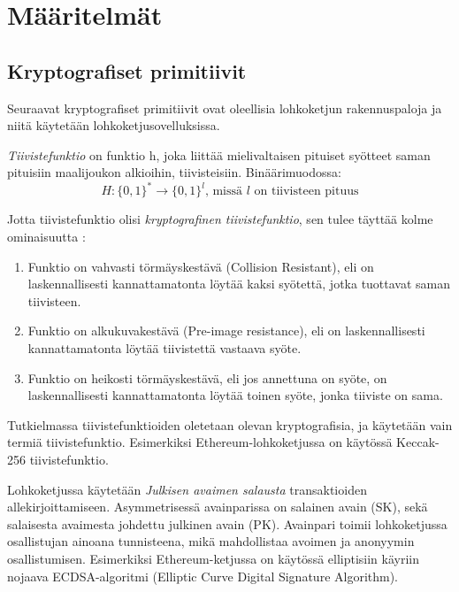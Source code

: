 \chapter{Määritelmät\label{methods}}

\section{Kryptografiset primitiivit}

Seuraavat kryptografiset primitiivit ovat oleellisia lohkoketjun rakennuspaloja ja niitä käytetään lohkoketjusovelluksissa.

\textit{Tiivistefunktio} on funktio h, joka liittää mielivaltaisen pituiset syötteet saman pituisiin maalijoukon alkioihin, tiivisteisiin. Binäärimuodossa: 
\begin{equation}
    H : \{0, 1\}^* \longrightarrow  \{0, 1\}^l \text{, missä $l$ on tiivisteen pituus}
\end{equation}

Jotta tiivistefunktio olisi \textit{kryptografinen tiivistefunktio}, sen tulee täyttää kolme ominaisuutta \cite{cryptoeprint:2011:565}: 
\begin{enumerate}
    \item Funktio on vahvasti törmäyskestävä (Collision Resistant), eli on laskennallisesti kannattamatonta löytää kaksi syötettä, jotka tuottavat saman tiivisteen.
    \item Funktio on alkukuvakestävä (Pre-image resistance), eli on laskennallisesti kannattamatonta löytää tiivistettä vastaava syöte.
    \item Funktio on heikosti törmäyskestävä, eli jos annettuna on syöte, on laskennallisesti kannattamatonta löytää toinen syöte, jonka tiiviste on sama.
\end{enumerate}

Tutkielmassa tiivistefunktioiden oletetaan olevan kryptografisia, ja käytetään vain termiä tiivistefunktio. Esimerkiksi Ethereum-lohkoketjussa on käytössä Keccak-256 tiivistefunktio. 

Lohkoketjussa käytetään \textit{Julkisen avaimen salausta} transaktioiden allekirjoittamiseen. Asymmetrisessä avainparissa on salainen avain (SK), sekä salaisesta avaimesta johdettu julkinen avain (PK). Avainpari toimii lohkoketjussa osallistujan ainoana tunnisteena, mikä mahdollistaa avoimen ja anonyymin osallistumisen. Esimerkiksi Ethereum-ketjussa on käytössä elliptisiin käyriin nojaava ECDSA-algoritmi (Elliptic Curve Digital Signature Algorithm). 

